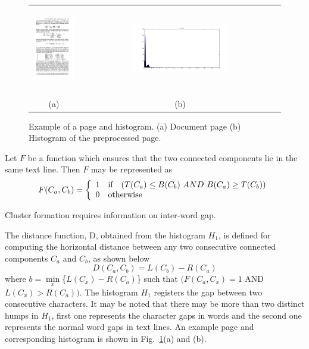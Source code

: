 \documentclass[oneside,a4paper,12pt]{book}
\begin{document}
\begin{figure}[h]\center\footnotesize
\begin{tabular}{|c|c|}\hline
 \includegraphics[width=2.0in, height = 1.5in]{page_image.png} &
 \includegraphics[width=0.5\textwidth]{cw_gap.png} \\ 
 (a)  &(b)
 \\\hline
 \end{tabular}
 \caption{Example of a page and histogram. (a) Document page (b) Histogram of the preprocessed page.}
 \label{page_histo}
\end{figure}

Let  $F$ be a function which ensures that the two connected
components lie in the same text line.
Then $F$ may be represented as
{\scriptsize
\[F(C_a,C_b)=\left\{ \begin{array}{llc}
1 & \mbox{if} & (T(C_a)\leq B(C_b)\  AND\  B(C_a)\geq T(C_b)) \\
0  & \multicolumn{2}{l}{\mbox{otherwise}}
\end{array} \right. \]
}

Cluster formation requires information on inter-word gap. 

The  distance function, D, obtained from the histogram $H_1$, is defined for computing the horizontal
distance between any two consecutive connected components $C_a$ and $C_b$, as shown below
\[D(C_a,C_b) = L(C_b) - R(C_a)\]
where $b = \min\limits_x$\{${ L(C_x) - R(C_a)}$\} such that $(F(C_a,C_x) = 1$
AND $L(C_x)>R(C_a))$.
The histogram $H_1$ registers the  gap between
two consecutive characters.
It may be noted that  there may be more than two
distinct humps in $H_1$, first one represents the character gaps in  words and the second one
represents the normal word gaps in  text lines. An example page
and corresponding histogram is shown in
Fig.~\ref{page_histo}(a) and (b).
\end{document}
